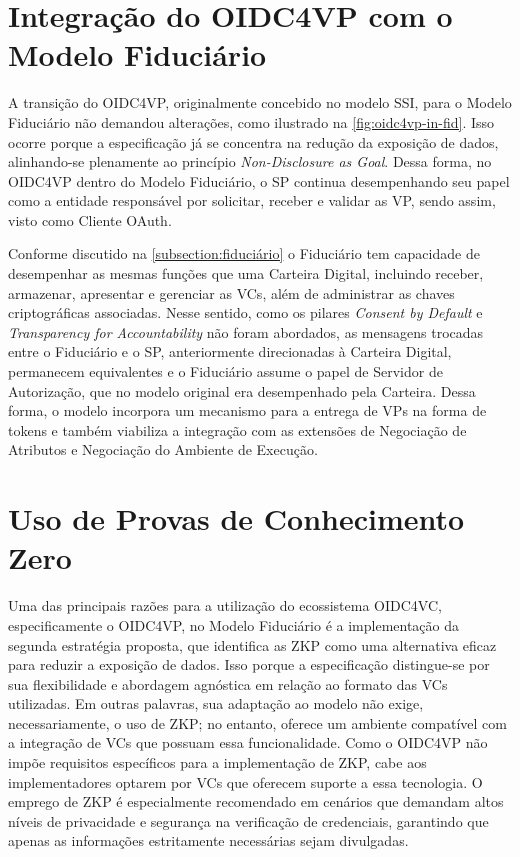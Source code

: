 

\section{Integração do OIDC4VP com o Modelo Fiduciário}

A transição do OIDC4VP, originalmente concebido no modelo \acs{SSI}, para o Modelo Fiduciário não demandou alterações, como ilustrado na \autoref{fig:oidc4vp-in-fid}. Isso ocorre porque a especificação já se concentra na redução da exposição de dados, alinhando-se plenamente ao princípio \emph{Non-Disclosure as Goal}. Dessa forma, no \acs{OIDC4VP} dentro do Modelo Fiduciário, o \acs{SP} continua desempenhando seu papel como a entidade responsável por solicitar, receber e validar as \acs{VP}, sendo assim, visto como Cliente OAuth.

Conforme discutido na \autoref{subsection:fiduciário} o Fiduciário tem capacidade de desempenhar as mesmas funções que uma Carteira Digital, incluindo receber, armazenar, apresentar e gerenciar as \acs{VC}s, além de administrar as chaves criptográficas associadas. Nesse sentido, como os pilares \emph{Consent by Default} e \emph{Transparency for Accountability} não foram abordados, as mensagens trocadas entre o Fiduciário e o \acs{SP}, anteriormente direcionadas à Carteira Digital, permanecem equivalentes e o Fiduciário assume o papel de Servidor de Autorização, que no modelo original era desempenhado pela Carteira. Dessa forma, o modelo incorpora um mecanismo para a entrega de \acs{VP}s na forma de tokens e também viabiliza a integração com as extensões de Negociação de Atributos e Negociação do Ambiente de Execução.



\section{Uso de Provas de Conhecimento Zero}

Uma das principais razões para a utilização do ecossistema \acs{OIDC4VC}, especificamente o \acs{OIDC4VP}, no Modelo Fiduciário é a implementação da segunda estratégia proposta, que identifica as \acs{ZKP} como uma alternativa eficaz para reduzir a exposição de dados. Isso porque a especificação distingue-se por sua flexibilidade e abordagem agnóstica em relação ao formato das \acs{VC}s utilizadas. Em outras palavras, sua adaptação ao modelo não exige, necessariamente, o uso de ZKP; no entanto, oferece um ambiente compatível com a integração de \acs{VC}s que possuam essa funcionalidade.
Como o \acs{OIDC4VP} não impõe requisitos específicos para a implementação de \acs{ZKP}, cabe aos implementadores optarem por \acs{VC}s que oferecem suporte a essa tecnologia. O emprego de ZKP é especialmente recomendado em cenários que demandam altos níveis de privacidade e segurança na verificação de credenciais, garantindo que apenas as informações estritamente necessárias sejam divulgadas.

